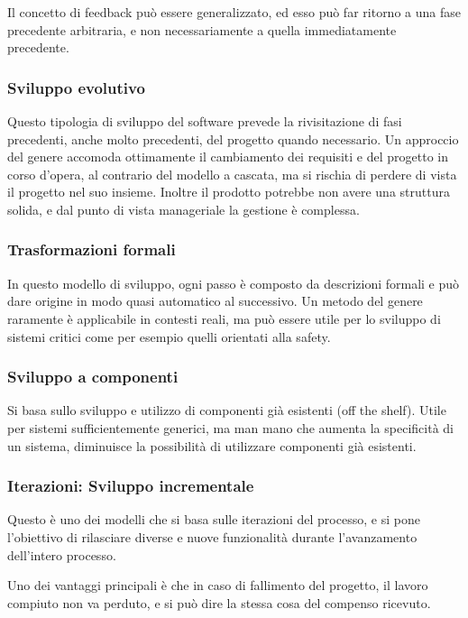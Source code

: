         Il concetto di feedback può essere generalizzato, ed esso può far ritorno a una fase precedente arbitraria, e non necessariamente a quella immediatamente precedente.
        
    \subsubsection{Sviluppo evolutivo}
        Questo tipologia di sviluppo del software prevede la rivisitazione di fasi precedenti, anche molto precedenti, del progetto quando necessario. Un approccio del genere accomoda ottimamente il cambiamento dei requisiti e del progetto in corso d'opera, al contrario del modello a cascata, ma si rischia di perdere di vista il progetto nel suo insieme. Inoltre il prodotto potrebbe non avere una struttura solida, e dal punto di vista manageriale la gestione è complessa.
        
    \subsubsection{Trasformazioni formali}
        In questo modello di sviluppo, ogni passo è composto da descrizioni formali e può dare origine in modo quasi automatico al successivo. Un metodo del genere raramente è applicabile in contesti reali, ma può essere utile per lo sviluppo di sistemi critici come per esempio quelli orientati alla safety.
        
    \subsubsection{Sviluppo a componenti}
        Si basa sullo sviluppo e utilizzo di componenti già esistenti (off the shelf). Utile per sistemi sufficientemente generici, ma man mano che aumenta la specificità di un sistema, diminuisce la possibilità di utilizzare componenti già esistenti.
        
    \subsubsection{Iterazioni: Sviluppo incrementale}
        Questo è uno dei modelli che si basa sulle iterazioni del processo, e si pone l'obiettivo di rilasciare diverse e nuove funzionalità durante l'avanzamento dell'intero processo.
        
        Uno dei vantaggi principali è che in caso di fallimento del progetto, il lavoro compiuto non va perduto, e si può dire la stessa cosa del compenso ricevuto.
        
